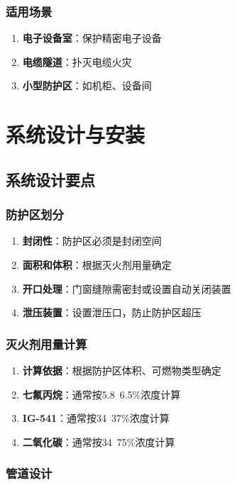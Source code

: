 \documentclass[12pt,UTF8]{ctexbook}
\begin{document}
\section{适用场景}

\begin{enumerate}
    \item \textbf{电子设备室}：保护精密电子设备
    \item \textbf{电缆隧道}：扑灭电缆火灾
    \item \textbf{小型防护区}：如机柜、设备间
\end{enumerate}

\part{系统设计与安装}

\chapter{系统设计要点}

\section{防护区划分}

\begin{enumerate}
    \item \textbf{封闭性}：防护区必须是封闭空间
    \item \textbf{面积和体积}：根据灭火剂用量确定
    \item \textbf{开口处理}：门窗缝隙需密封或设置自动关闭装置
    \item \textbf{泄压装置}：设置泄压口，防止防护区超压
\end{enumerate}

\section{灭火剂用量计算}

\begin{enumerate}
    \item \textbf{计算依据}：根据防护区体积、可燃物类型确定
    \item \textbf{七氟丙烷}：通常按5.8~6.5\%浓度计算
    \item \textbf{IG-541}：通常按34~37\%浓度计算
    \item \textbf{二氧化碳}：通常按34~75\%浓度计算
\end{enumerate}

\section{管道设计}
\end{document}
